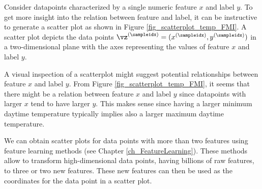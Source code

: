 \documentclass[12pt]{report}
\begin{document}
Consider datapoints characterized by a single numeric feature $x$ 
and label $y$. 
To get more insight into the relation between feature and label, 
it can be instructive to generate a scatter plot as shown in 
Figure \ref{fig_scatterplot_temp_FMI}. A scatter plot depicts the 
data points $\vz^{(\sampleidx)}=(x^{(\sampleidx)},y^{(\sampleidx)})$ 
in a two-dimensional plane with the axes representing the values 
of feature $x$ and label $y$. 

A visual inspection of a scatterplot might suggest potential 
relationships between feature $x$ and label $y$. From Figure 
\ref{fig_scatterplot_temp_FMI}, it seems that there might be 
a relation between feature $x$ and label $y$ since datapoints 
with larger $x$ tend to have larger $y$. This makes sense since 
having a larger minimum daytime temperature typically implies 
also a larger maximum daytime temperature. 

We can obtain scatter plots for data points with more than two 
features using feature learning methods (see Chapter \ref{ch_FeatureLearning}). 
These methods allow to transform high-dimensional data points, 
having billions of raw features, to three or two new features. 
These new features can then be used as the coordinates for the 
data point in a scatter plot.

\end{document}
